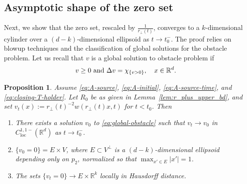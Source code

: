 \documentclass[11pt]{amsart}
\numberwithin{equation}{section}
\numberwithin{figure}{section}
\theoremstyle{plain}
\newtheorem{prop}[thm]{Proposition}
\theoremstyle{definition}
\theoremstyle{remark}
\theoremstyle{plain}
\newcommand{\abs}[1]{\lvert #1 \rvert}
\def\R{\mathbb{R}}
\begin{document}
\subsection{Asymptotic shape of the zero set}
\label{subsec:asymptotic-zero-set-shape}

Next, we show that the zero set, rescaled by
$\frac{1}{r_\perp(t)}$, converges to a $k$-dimensional cylinder over a
$(d-k)$-dimensional ellipsoid as $t\to t_0^-$.
The proof relies on blowup techniques and the classification of global solutions for the obstacle problem. Let us recall that $v$ is a global solution to obstacle problem if
\begin{equation}\label{eq:global-obstacle}
v\geq 0 \hbox{ and } \Delta v = \chi_{\{v>0\}}, \quad x\in \R^d.
\end{equation}
\begin{prop}\label{prop:cone_moving_blowup}
Assume \eqref{eq:A-source}, \eqref{eq:A-initial}, \eqref{eq:A-source-time}, and
\eqref{eq:closing-T-holder}. Let $R_0$ be as given in Lemma~\ref{lem:r_plus_upper_bd}, and set
$v_t(x):=r_\perp(t)^{-2}w(r_\perp(t)x,t)$ for $t < t_0$.
Then
\begin{enumerate}[label=(\alph*)]
\item There exists a solution $v_0$ to \eqref{eq:global-obstacle} such that $v_t\to v_0$ in $C^{1,1-}_{\mathrm{loc}}(\R^d)$ as $t\to t_0^-$.
\item $\{ v_0 = 0\} = E \times V$,
where $E\subset V^\perp$ is a $(d-k)$-dimensional ellipsoid depending only on $p_2$,
normalized so that $\max_{x'\in E}\abs{x'}=1$.
\item\label{item:cone-blowup-hausdorff-dist} The sets $\{ v_t = 0\} \to E\times \R^{k}$ locally in Hausdorff distance.
\end{enumerate}
\end{prop}
\end{document}
